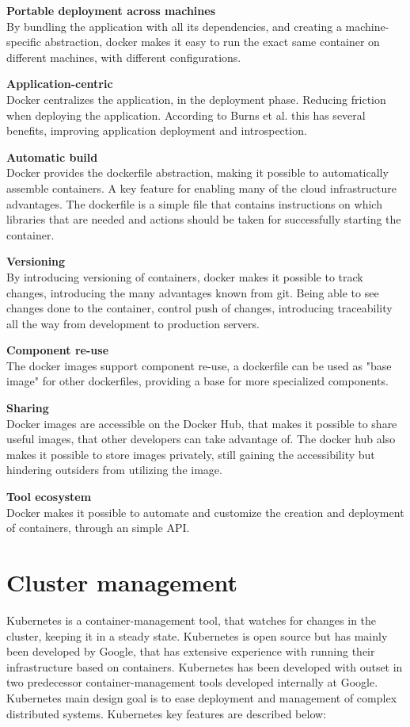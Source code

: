 \textbf{Portable deployment across machines}\\
By bundling the application with all its dependencies, and creating a machine-specific abstraction, docker makes it easy to run the exact same container on different machines, with different configurations.

\textbf{Application-centric}\\
Docker centralizes the application, in the deployment phase. Reducing friction when deploying the application. According to Burns et al.\cite{burns2016borg} this has several benefits, improving application deployment and introspection.

\textbf{Automatic build}\\
Docker provides the dockerfile abstraction, making it possible to automatically assemble containers. A key feature for enabling many of the cloud infrastructure advantages. The dockerfile is a simple file that contains instructions on which libraries that are needed and actions should be taken for successfully starting the container.

\textbf{Versioning}\\
By introducing versioning of containers, docker makes it possible to track changes, introducing the many advantages known from git. Being able to see changes done to the container, control push of changes, introducing traceability all the way from development to production servers.

\textbf{Component re-use}\\
The docker images support component re-use, a dockerfile can be used as "base image" for other dockerfiles, providing a base for more specialized components.

\textbf{Sharing}\\
Docker images are accessible on the Docker Hub, that makes it possible to share useful images, that other developers can take advantage of. The docker hub also makes it possible to store images privately, still gaining the accessibility but hindering outsiders from utilizing the image.

\textbf{Tool ecosystem}\\
Docker makes it possible to automate and customize the creation and deployment of containers, through an simple API.

\section{Cluster management}
Kubernetes is a container-management tool, that watches for changes in the cluster, keeping it in a steady state\cite{burns2016borg}. Kubernetes is open source but has mainly been developed by Google, that has extensive experience with running their infrastructure based on containers. Kubernetes has been developed with outset in two predecessor container-management tools developed internally at Google. Kubernetes main design goal is to ease deployment and management of complex distributed systems\cite{kubernetes_frontpage}. Kubernetes key features are described below:

